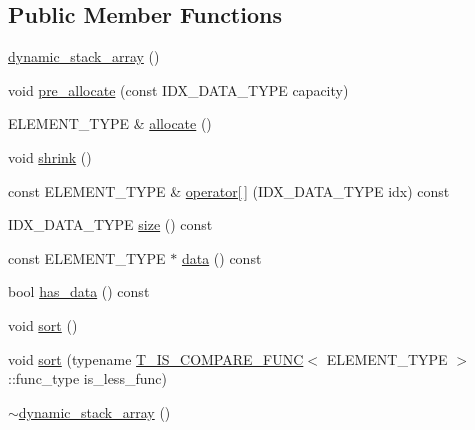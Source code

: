 \subsection*{Public Member Functions}
\begin{DoxyCompactItemize}
\item 
\hyperlink{classuva_1_1utils_1_1containers_1_1dynamic__stack__array_a1754532fe13afc671fb39b7c21180d5d}{dynamic\+\_\+stack\+\_\+array} ()
\item 
void \hyperlink{classuva_1_1utils_1_1containers_1_1dynamic__stack__array_a87a918e1b53a24703705413d15c09a1e}{pre\+\_\+allocate} (const I\+D\+X\+\_\+\+D\+A\+T\+A\+\_\+\+T\+Y\+P\+E capacity)
\item 
E\+L\+E\+M\+E\+N\+T\+\_\+\+T\+Y\+P\+E \& \hyperlink{classuva_1_1utils_1_1containers_1_1dynamic__stack__array_abeeed1d0abb83f9156eb88df90f409dc}{allocate} ()
\item 
void \hyperlink{classuva_1_1utils_1_1containers_1_1dynamic__stack__array_a5e87976588d212270bfefe71f876d394}{shrink} ()
\item 
const E\+L\+E\+M\+E\+N\+T\+\_\+\+T\+Y\+P\+E \& \hyperlink{classuva_1_1utils_1_1containers_1_1dynamic__stack__array_a7f9603910fd1716ade9d8ec4829deeb8}{operator\mbox{[}$\,$\mbox{]}} (I\+D\+X\+\_\+\+D\+A\+T\+A\+\_\+\+T\+Y\+P\+E idx) const 
\item 
I\+D\+X\+\_\+\+D\+A\+T\+A\+\_\+\+T\+Y\+P\+E \hyperlink{classuva_1_1utils_1_1containers_1_1dynamic__stack__array_a29162acd67bace7ace958e889602a404}{size} () const 
\item 
const E\+L\+E\+M\+E\+N\+T\+\_\+\+T\+Y\+P\+E $\ast$ \hyperlink{classuva_1_1utils_1_1containers_1_1dynamic__stack__array_ae1b82ff422b2f9c6e350e74ca5af3bae}{data} () const 
\item 
bool \hyperlink{classuva_1_1utils_1_1containers_1_1dynamic__stack__array_a2cc81846d67f0ef80fc4f015f3c8c5e0}{has\+\_\+data} () const 
\item 
void \hyperlink{classuva_1_1utils_1_1containers_1_1dynamic__stack__array_ab15aa9af1a762c6739a3a43dc54882c5}{sort} ()
\item 
void \hyperlink{classuva_1_1utils_1_1containers_1_1dynamic__stack__array_a879883a293bd797d2067860ba9fc59c1}{sort} (typename \hyperlink{structuva_1_1utils_1_1containers_1_1utils_1_1_t___i_s___c_o_m_p_a_r_e___f_u_n_c}{T\+\_\+\+I\+S\+\_\+\+C\+O\+M\+P\+A\+R\+E\+\_\+\+F\+U\+N\+C}$<$ E\+L\+E\+M\+E\+N\+T\+\_\+\+T\+Y\+P\+E $>$\+::func\+\_\+type is\+\_\+less\+\_\+func)
\item 
\hyperlink{classuva_1_1utils_1_1containers_1_1dynamic__stack__array_a22984ca8d2a650bfe9d12614724a0902}{$\sim$dynamic\+\_\+stack\+\_\+array} ()
\end{DoxyCompactItemize}
